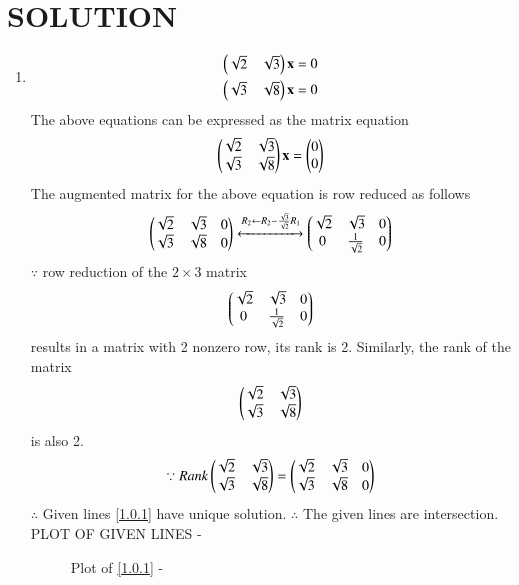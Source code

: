 \documentclass[journal,12pt,twocolumn]{IEEEtran}
\begin{document}
\section{SOLUTION}  
\begin{enumerate}
\item
\begin{align}
\begin{split}
\begin{pmatrix}\sqrt{2}& \sqrt{3} \end{pmatrix}\mathbf{x}&=0
\\
\begin{pmatrix}\sqrt{3}& \sqrt{8} \end{pmatrix}\mathbf{x}&=0
\end{split}
\end{align}
The above equations can be expressed as the matrix equation
\begin{align}
\begin{pmatrix}\sqrt{2} & \sqrt {3}\\\sqrt{3} & \sqrt{8}\end{pmatrix} \mathbf{x} = \begin{pmatrix}0\\0\end{pmatrix}
\end{align}
%
The augmented matrix for the above equation is row reduced as follows
\begin{align}
\begin{pmatrix}\sqrt{2} & \sqrt{3}& 0\\\sqrt {3}& \sqrt{8}& 0\end{pmatrix} 
\xleftrightarrow {R_2\leftarrow R_2-\frac{\sqrt{3}}{\sqrt{2}}R_1}\begin{pmatrix}\sqrt{2}& \sqrt{3}& 0\\0 & \frac{1}{\sqrt{2}}& 0\end{pmatrix}
\\ 
\end{align}
%
$\because$ row reduction of the $2\times 3$ matrix
%
\begin{align}
\begin{pmatrix}\sqrt{2} & \sqrt{3}& 0\\0 & \frac{1}{\sqrt{2}}& 0\end{pmatrix} 
\end{align}
%
results in a matrix with 2 nonzero row, its rank is 2. 
%
Similarly, the rank of the matrix 
\begin{align}
\begin{pmatrix}\sqrt{2} & \sqrt{3}\\\sqrt{3} & \sqrt{8 }\end{pmatrix}
\end{align}
%
is also 2.
%
\begin{align}
\because Rank \begin{pmatrix}\sqrt{2} & \sqrt {3}\\\sqrt{3} & \sqrt{8}\end{pmatrix} &=\begin{pmatrix}\sqrt{2} & \sqrt{3}& 0\\\sqrt{3} & \sqrt{8}& 0\end{pmatrix}\nonumber\\
\end{align}
$\therefore$ Given lines \eqref{1.0.1} have unique solution.
$\therefore$ The given lines are intersection.
PLOT OF GIVEN LINES -
\begin{figure}[ht!]
Plot of \eqref{1.0.1} -
    \centering

\end{figure}
\end{enumerate}
\end{document}
